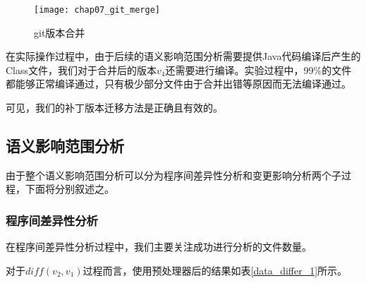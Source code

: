 \begin{figure}[H]
	\centering
	\texttt{[image: chap07\_git\_merge]}
	\caption {git版本合并}
	\label {exp_git_merge}	
\end{figure}

在实际操作过程中，由于后续的语义影响范围分析需要提供Java代码编译后产生的Class文件，我们对于合并后的版本$v_4$还需要进行编译。实验过程中，99\%的文件都能够正常编译通过，只有极少部分文件由于合并出错等原因而无法编译通过。

可见，我们的补丁版本迁移方法是正确且有效的。

%
%

\subsection{语义影响范围分析}

由于整个语义影响范围分析可以分为程序间差异性分析和变更影响分析两个子过程，下面将分别叙述之。

\subsubsection{程序间差异性分析}

在程序间差异性分析过程中，我们主要关注成功进行分析的文件数量。

对于$diff(v_2,v_1)$过程而言，使用预处理器后的结果如表\ref {data_differ_1}所示。


